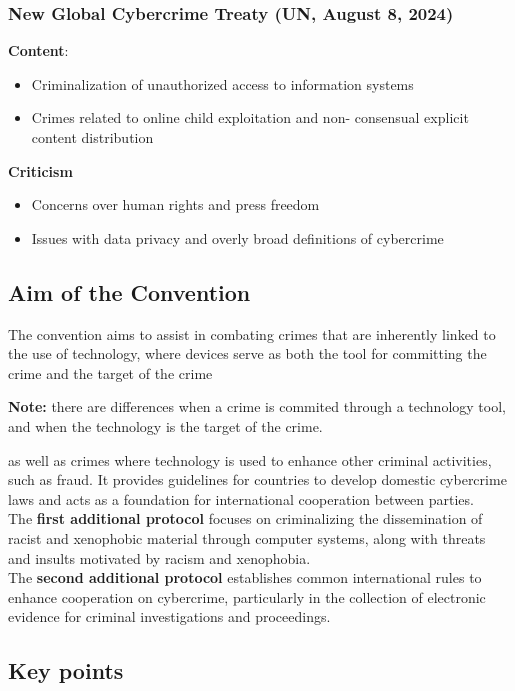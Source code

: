 \subsubsection{New Global Cybercrime Treaty (UN, August 8, 2024)}

\textbf{Content}:
\begin{itemize}[itemsep=0pt]
  \item Criminalization of unauthorized access to information systems
  \item Crimes related to online child exploitation and non- consensual explicit content distribution
\end{itemize}

\textbf{Criticism}
\begin{itemize}[itemsep=0pt]
  \item Concerns over human rights and press freedom
  \item Issues with data privacy and overly broad definitions of cybercrime
\end{itemize}

\subsection{Aim of the Convention}
The convention aims to assist in combating crimes that are inherently linked to the use of technology, where devices serve as both the tool for committing the crime and the target of the crime
\begin{boxH}
  \textbf{Note:} there are differences when a crime is commited through a technology tool, and when the technology is the target of the crime.
\end{boxH}
as well as crimes where technology is used to enhance other criminal activities, such as fraud. It provides guidelines for countries to develop domestic cybercrime laws and acts as a foundation for international cooperation between parties.\\The \textbf{first additional protocol} focuses on criminalizing the dissemination of racist and xenophobic material through computer systems, along with threats and insults motivated by racism and xenophobia.\\ The \textbf{second additional protocol} establishes common international rules to enhance cooperation on cybercrime, particularly in the collection of electronic evidence for criminal investigations and proceedings.

\subsection{Key points}

